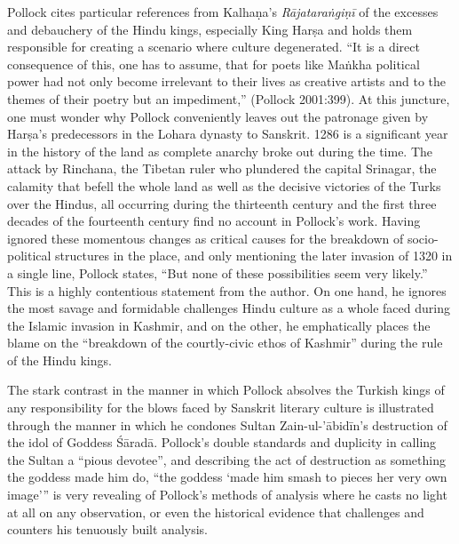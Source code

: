 Pollock cites particular references from Kalhaṇa’s {\sl Rājataraṅgiṇī} of the excesses and debauchery of the Hindu kings, especially King Harṣa and holds them responsible for creating a scenario where culture degenerated. “It is a direct consequence of this, one has to assume, that for poets like Maṅkha political power had not only become irrelevant to their lives as creative artists and to the themes of their poetry but an impediment,” (Pollock 2001:399). At this juncture, one must wonder why Pollock conveniently leaves out the patronage given by Harṣa’s predecessors in the Lohara dynasty to Sanskrit. 1286 is a significant year in the history of the land as complete anarchy broke out during the time. The attack by Rinchana, the Tibetan ruler who plundered the capital Srinagar, the calamity that befell the whole land as well as the decisive victories of the Turks over the Hindus, all occurring during the thirteenth century and the first three decades of the fourteenth century find no account in Pollock’s work. Having ignored these momentous changes as critical causes for the breakdown of socio-political structures in the place, and only mentioning the later invasion of 1320 in a single line, Pollock states, “But none of these possibilities seem very likely.” This is a highly contentious statement from the author. On one hand, he ignores the most savage and formidable challenges Hindu culture as a whole faced during the Islamic invasion in Kashmir, and on the other, he emphatically places the blame on the “breakdown of the courtly-civic ethos of Kashmir” during the rule of the Hindu kings.

The stark contrast in the manner in which Pollock absolves the Turkish kings of any responsibility for the blows faced by Sanskrit literary culture is illustrated through the manner in which he condones Sultan Zain-ul-’ābidīn’s destruction of the idol of Goddess Śāradā. Pollock’s double standards and duplicity in calling the Sultan a “pious devotee”, and describing the act of destruction as something the goddess made him do, “the goddess ‘made him smash to pieces her very own image’” is very revealing of Pollock’s methods of analysis where he casts no light at all on any observation, or even the historical evidence that challenges and counters his tenuously built analysis.

